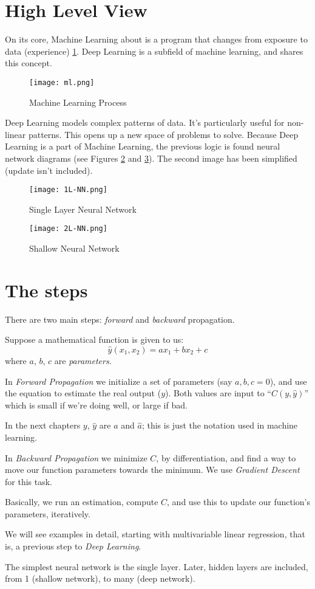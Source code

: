 \section{High Level View}

On its core, Machine Learning about is a program that changes from exposure to data (experience) \ref{fig:learn}. Deep Learning is a subfield of machine learning, and shares this concept.

\begin{figure}[h]
 \centering
 \texttt{[image: ml.png]}
  \caption{Machine Learning Process}\label{fig:learn}
\end{figure}

Deep Learning models complex patterns of data. It's particularly useful for non-linear patterns. This opens up a new space of problems to solve. Because Deep Learning is a part of Machine Learning, the previous logic is found neural network diagrams (see Figures \ref{fig:single} and \ref{fig:shallow}). The second image has been simplified (update isn't included).

\begin{figure}
 \centering
 \texttt{[image: 1L-NN.png]}
 \caption{Single Layer Neural Network}
 \label{fig:single}
\end{figure}


\begin{figure}
 \centering
 \texttt{[image: 2L-NN.png]}
 \caption{Shallow Neural Network}
 \label{fig:shallow}
\end{figure}

\section{The steps}
There are two main steps: \textit{forward} and \textit{backward} propagation. 

Suppose a mathematical function is given to us:
$$ \hat{y}(x_1,x_2) = a x_1 + b x_2 + c$$
where $a$, $b$, $c$ are \textit{parameters}.

In \textit{Forward Propagation} we initialize a set of parameters (say $a,b,c=0$), and use the equation to estimate the real output ($y$). Both values are input to ``$C(y, \hat{y})$'' which is small if we're doing well, or large if bad.

In the next chapters $y$, $\hat{y}$ are $a$ and $\hat{a}$; this is just the notation used in machine learning.

In \textit{Backward Propagation} we minimize $C$, by differentiation, and find a way to move our function parameters towards the minimum. We use \textit{Gradient Descent} for this task.

Basically, we run an estimation, compute $C$, and use this to update our function's parameters, iteratively.

We will see examples in detail, starting with multivariable linear regression, that is, a previous step to \textit{Deep Learning}.

The simplest neural network is the single layer. Later, hidden layers are included, from 1 (shallow network), to many (deep network).

